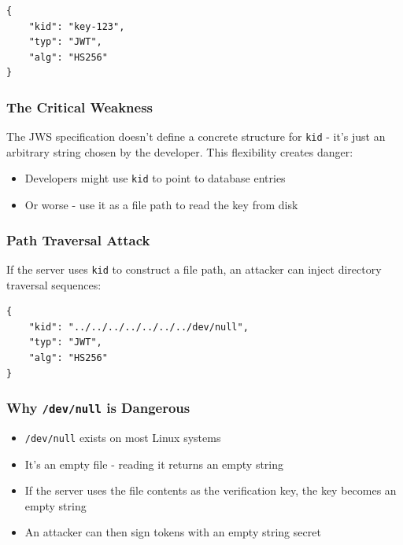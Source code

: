 \documentclass{article}
\begin{document}
\begin{lstlisting}[caption=JWT Header with kid]
{
    "kid": "key-123",
    "typ": "JWT",
    "alg": "HS256"
}
\end{lstlisting}

\subsubsection{The Critical Weakness}

The JWS specification doesn't define a concrete structure for \texttt{kid} - it's just an arbitrary string chosen by the developer. This flexibility creates danger:

\begin{itemize}
    \item Developers might use \texttt{kid} to point to database entries
    \item Or worse - use it as a file path to read the key from disk
\end{itemize}

\subsubsection{Path Traversal Attack}

If the server uses \texttt{kid} to construct a file path, an attacker can inject directory traversal sequences:

\begin{lstlisting}[caption=Malicious Header with Path Traversal]
{
    "kid": "../../../../../../../dev/null",
    "typ": "JWT",
    "alg": "HS256"
}
\end{lstlisting}

\subsubsection{Why \texttt{/dev/null} is Dangerous}

\begin{itemize}
    \item \texttt{/dev/null} exists on most Linux systems
    \item It's an empty file - reading it returns an empty string
    \item If the server uses the file contents as the verification key, the key becomes an empty string
    \item An attacker can then sign tokens with an empty string secret
\end{itemize}
\end{document}
